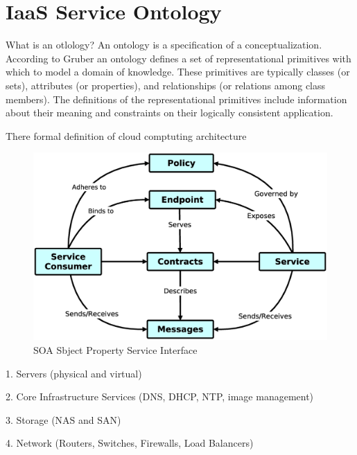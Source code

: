 
\section{IaaS Service Ontology}

What is an otlology? An ontology is a specification of a conceptualization. According to Gruber \cite{OntologyDefinition} an ontology defines a set of representational primitives with which to model a domain of knowledge. These  primitives are typically classes (or sets), attributes (or properties), and relationships (or relations among class members). The definitions of the representational primitives include information about their meaning and constraints on their logically consistent application.




There formal definition of cloud comptuting architecture 

\begin{figure}[!h]
\centering
\includegraphics[scale=.2]{img/soa_relation.eps}
\caption{SOA Sbject Property Service Interface}
\label{fig:cm}
\end{figure}

1. Servers (physical and virtual)

2. Core Infrastructure Services (DNS, DHCP, NTP, image management)

3. Storage (NAS and SAN)

4. Network (Routers, Switches, Firewalls, Load Balancers)

